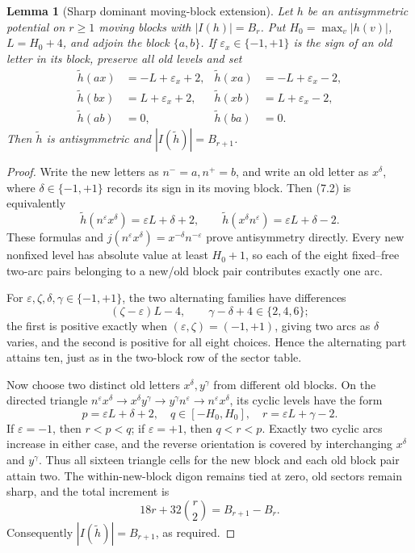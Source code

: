 \documentclass[11pt,a4paper]{article}
\newtheorem{lemma}[theorem]{Lemma}
\theoremstyle{remark}
\begin{document}
\begin{lemma}[Sharp dominant moving-block extension]
\label{lem:dominant-extension}
Let \(h\) be an antisymmetric potential on \(r\geq1\) moving blocks with
\(|I(h)|=B_r\).  Put \(H_0=\max_v|h(v)|\), \(L=H_0+4\), and adjoin the
block \(\{a,b\}\).  If \(\varepsilon_x\in\{-1,+1\}\) is the sign of an old
letter in its block, preserve all old levels and set
\[
\begin{array}{rclrcl}
 \widetilde h(ax)&=-L+\varepsilon_x+2,&
 \widetilde h(xa)&=-L+\varepsilon_x-2,\\
 \widetilde h(bx)&= L+\varepsilon_x+2,&
 \widetilde h(xb)&= L+\varepsilon_x-2,\\
 \widetilde h(ab)&=0,&\widetilde h(ba)&=0.
\end{array}                                             \tag{7.2}
\]
Then \(\widetilde h\) is antisymmetric and
\(|I(\widetilde h)|=B_{r+1}\).
\end{lemma}

\begin{proof}
Write the new letters as \(n^-=a,n^+=b\), and write an old letter as
\(x^\delta\), where \(\delta\in\{-1,+1\}\) records its sign in its moving
block.  Then (7.2) is equivalently
\[
 \widetilde h(n^\varepsilon x^\delta)=\varepsilon L+\delta+2,
 \qquad
 \widetilde h(x^\delta n^\varepsilon)=\varepsilon L+\delta-2.
\]
These formulas and
\(j(n^\varepsilon x^\delta)=x^{-\delta}n^{-\varepsilon}\) prove
antisymmetry directly.  Every new nonfixed level has absolute value at least
\(H_0+1\), so each of the eight fixed--free two-arc pairs belonging to a
new/old block pair contributes exactly one arc.

For \(\varepsilon,\zeta,\delta,\gamma\in\{-1,+1\}\), the two alternating
families have differences
\[
 (\zeta-\varepsilon)L-4,
 \qquad \gamma-\delta+4\in\{2,4,6\};
\]
the first is positive exactly when
\((\varepsilon,\zeta)=(-1,+1)\), giving two arcs as \(\delta\) varies, and
the second is positive for all eight choices.  Hence the alternating part
attains ten, just as in the two-block row of the sector table.

Now choose two distinct old letters \(x^\delta,y^\gamma\) from different
old blocks.  On the directed triangle
\(n^\varepsilon x^\delta\to x^\delta y^\gamma
\to y^\gamma n^\varepsilon\to n^\varepsilon x^\delta\), its cyclic levels
have the form
\[
 p=\varepsilon L+\delta+2,
 \quad q\in[-H_0,H_0],
 \quad r=\varepsilon L+\gamma-2.
\]
If \(\varepsilon=-1\), then \(r<p<q\); if \(\varepsilon=+1\), then
\(q<r<p\).  Exactly two cyclic arcs increase in either case, and the reverse
orientation is covered by interchanging \(x^\delta\) and \(y^\gamma\).
Thus all sixteen triangle cells for the new block and each old block pair
attain two.  The within-new-block digon remains tied at zero, old sectors
remain sharp, and the total increment is
\[
 18r+32\binom r2=B_{r+1}-B_r.
\]
Consequently \(|I(\widetilde h)|=B_{r+1}\), as required.
\end{proof}
\end{document}

